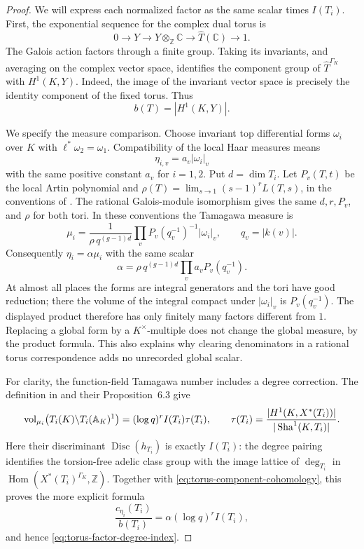 \begin{proof}
We will express each normalized factor as the same scalar times
$I(T_i)$.  First, the exponential sequence for the complex dual torus is
\[
 0\longrightarrow Y\longrightarrow Y\otimes_{\mathbb Z}\mathbb C
   \longrightarrow\widehat T(\mathbb C)\longrightarrow 1.
\]
The Galois action factors through a finite group.  Taking its invariants,
and averaging on the complex vector space, identifies the component
group of $\widehat T^{\Gamma_K}$ with $H^1(K,Y)$.  Indeed, the image of
the invariant vector space is precisely the identity component of the
fixed torus.  Thus
\begin{equation}
 \label{eq:torus-component-cohomology}
 b(T)=|H^1(K,Y)|.
\end{equation}

We specify the measure comparison.  Choose invariant top differential
forms $\omega_i$ over $K$ with $\ell^*\omega_2=\omega_1$.
Compatibility of the local Haar measures means
\[
 \eta_{i,v}=a_v|\omega_i|_v
\]
with the same positive constant $a_v$ for $i=1,2$.  Put $d=\dim T_i$.
Let $P_v(T,t)$ be the local Artin polynomial and
$\rho(T)=\lim_{s\to1}(s-1)^rL(T,s)$, in the conventions of
\citet[Section~6]{GeisserSuzuki2022}.  The rational Galois-module
isomorphism gives the same $d,r,P_v$, and $\rho$ for both tori.  In these
conventions the Tamagawa measure is
\begin{equation}
 \label{eq:torus-tamagawa-measure}
 \mu_i=\frac{1}{\rho\,q^{(g-1)d}}
              \prod_v P_v(q_v^{-1})^{-1}|\omega_i|_v,
 \qquad q_v=|k(v)|.
\end{equation}
Consequently $\eta_i=\alpha\mu_i$ with the same scalar
\[
 \alpha=\rho\,q^{(g-1)d}\prod_v a_vP_v(q_v^{-1}).
\]
At almost all places the forms are integral generators and the tori
have good reduction; there the volume of the integral compact under
$|\omega_i|_v$ is $P_v(q_v^{-1})$.  The displayed product therefore has
only finitely many factors different from $1$.  Replacing a global form
by a $K^\times$-multiple does not change the global measure, by the product
formula.  This also explains why clearing denominators in a rational
torus correspondence adds no unrecorded global scalar.

For clarity, the function-field Tamagawa number includes a degree
correction.  The definition in \citet[Section~6]{GeisserSuzuki2022} and
their Proposition~6.3 give
\[
 \operatorname{vol}_{\mu_i}
        \bigl(T_i(K)\backslash T_i(\mathbb A_K)^1\bigr)
   =(\log q)^r I(T_i)\tau(T_i),
 \qquad
 \tau(T_i)=\frac{|H^1(K,X^*(T_i))|}{|\operatorname{Sha}^1(K,T_i)|}.
\]
Here their discriminant $\operatorname{Disc}(h_{T_i})$ is exactly
$I(T_i)$: the degree pairing identifies the torsion-free adelic class
group with the image lattice of $\deg_{T_i}$ in
$\operatorname{Hom}(X^*(T_i)^{\Gamma_K},\mathbb Z)$.
Together with \eqref{eq:torus-component-cohomology}, this proves the
more explicit formula
\begin{equation}
 \label{eq:torus-factor-explicit}
 \frac{c_{\eta_i}(T_i)}{b(T_i)}
       =\alpha(\log q)^r I(T_i),
\end{equation}
and hence \eqref{eq:torus-factor-degree-index}.


\end{proof}

